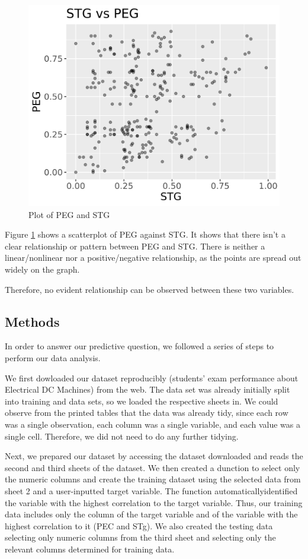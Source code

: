 \documentclass[
]{article}
\begin{document}
\begin{figure}
\includegraphics[width=0.5\linewidth]{../results/stats/peg_stg} \caption{Plot of PEG and STG}\label{fig:peg-stg-plot}
\end{figure}

Figure \ref{fig:peg-stg-plot} shows a scatterplot of PEG against STG. It shows that there isn't a clear relationship or pattern between PEG and STG. There is neither a linear/nonlinear nor a positive/negative relationship, as the points are spread out widely on the graph.

Therefore, no evident relationship can be observed between these two variables.

\hypertarget{methods}{%
\subsection{Methods}\label{methods}}

In order to answer our predictive question, we followed a series of steps to perform our data analysis.

We first dowloaded our dataset reproducibly (students' exam performance about Electrical DC Machines) from the web. The data set was already initially split into training and data sets, so we loaded the respective sheets in. We could observe from the printed tables that the data was already tidy, since each row was a single observation, each column was a single variable, and each value was a single cell. Therefore, we did not need to do any further tidying.

Next, we prepared our dataset by accessing the dataset downloaded and reads the second and third sheets of the dataset. We then created a dunction to select only the numeric columns and create the training dataset using the selected data from sheet 2 and a user-inputted target variable. The function automaticallyidentified the variable with the highest correlation to the target variable. Thus, our training data includes only the column of the target variable and of the variable with the highest correlation to it (PEC and STg). We also created the testing data selecting only numeric columns from the third sheet and selecting only the relevant columns determined for training data.
\end{document}
